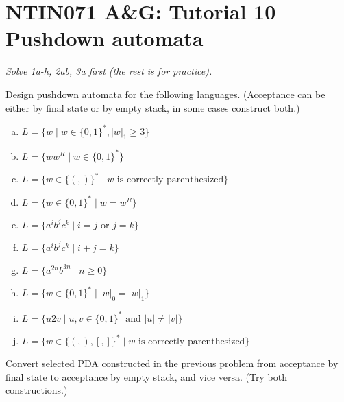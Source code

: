 \documentclass[a4paper,12pt]{amsart}
\begin{document}

\section*{NTIN071 A\&G: Tutorial 10 -- Pushdown automata}


\medskip

\noindent\emph{Solve 1a-h, 2ab, 3a first (the rest is for practice).}

\medskip

\medskip\begin{problem}

    Design pushdown automata for the following languages. (Acceptance can be either by final state or by empty stack, in some cases construct both.)

    \bigskip

    \begin{enumerate}[(a)]\setlength\itemsep{12pt}
        \item $L=\{w\mid w\in\{0,1\}^*,|w|_1\geq 3\}$
        \item $L=\{ww^R\mid w\in \{0,1\}^*\}$
        \item $L=\{w\in\{(,)\}^*\mid w\text{ is correctly parenthesized}\}$
        \item $L=\{w\in \{0,1\}^*\mid w=w^R\}$
        \item $L=\{a^ib^jc^k\mid i=j \text{ or } j=k\} $
        \item $L=\{a^ib^jc^k\mid i+j=k\}$
        \item $L=\{a^{2n}b^{3n}\mid n\geq 0\}$
        \item $L=\{w\in \{0,1\}^*\mid  |w|_0=|w|_1\} $
        \item $L=\{u2v\mid u,v\in \{0,1\}^*\text{ and }|u|\neq |v|\}$
        \item $L=\{w\in\{(,),[,]\}^*\mid w\text{ is correctly parenthesized}\}$           
    \end{enumerate}

\end{problem}


\medskip\begin{problem}

    Convert selected PDA constructed in the previous problem from acceptance by final state to acceptance by empty stack, and vice versa. (Try both constructions.)

\end{problem}
\end{document}
